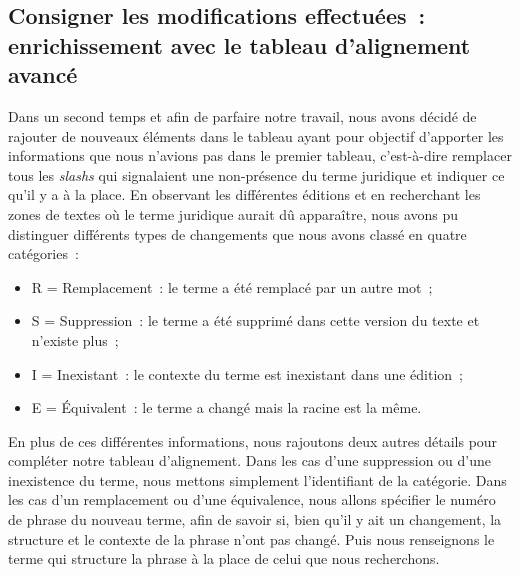 \subsection{Consigner les modifications effectuées~: enrichissement avec le tableau d’alignement avancé}
Dans un second temps et afin de parfaire notre travail, nous avons décidé de rajouter de nouveaux éléments dans le tableau ayant pour objectif d’apporter les informations que nous n’avions pas dans le premier tableau, c’est-à-dire remplacer tous les \textit{slashs} qui signalaient une non-présence du terme juridique et indiquer ce qu’il y a à la place. En observant les différentes éditions et en recherchant les zones de textes où le terme juridique aurait dû apparaître, nous avons pu distinguer différents types de changements que nous avons classé en quatre catégories~:
\begin{itemize}
    \item R = Remplacement~: le terme a été remplacé par un autre mot~;
    \item S = Suppression~: le terme a été supprimé dans cette version du texte et n’existe plus~;
    \item I = Inexistant~: le contexte du terme est inexistant dans une édition~;
    \item E = Équivalent~: le terme a changé mais la racine est la même.
\end{itemize}
En plus de ces différentes informations, nous rajoutons deux autres détails pour compléter notre tableau d’alignement. Dans les cas d’une suppression ou d’une inexistence du terme, nous mettons simplement l’identifiant de la catégorie. Dans les cas d’un remplacement ou d’une équivalence, nous allons spécifier le numéro de phrase du nouveau terme, afin de savoir si, bien qu’il y ait un changement, la structure et le contexte de la phrase n’ont pas changé. Puis nous renseignons le terme qui structure la phrase à la place de celui que nous recherchons.


